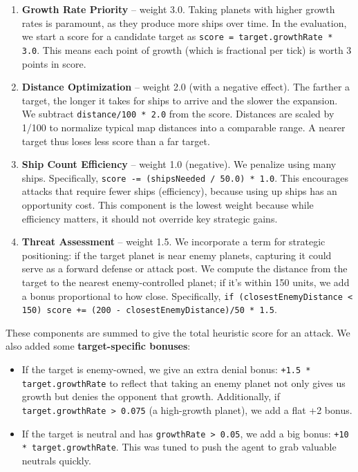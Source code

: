 \documentclass[conference]{IEEEtran}
\begin{document}
\begin{enumerate}
\item \textbf{Growth Rate Priority} -- weight 3.0. Taking planets with higher growth rates is paramount, as they produce more ships over time. In the evaluation, we start a score for a candidate target as \texttt{score = target.growthRate * 3.0}. This means each point of growth (which is fractional per tick) is worth 3 points in score.

\item \textbf{Distance Optimization} -- weight 2.0 (with a negative effect). The farther a target, the longer it takes for ships to arrive and the slower the expansion. We subtract \texttt{distance/100 * 2.0} from the score. Distances are scaled by 1/100 to normalize typical map distances into a comparable range. A nearer target thus loses less score than a far target.

\item \textbf{Ship Count Efficiency} -- weight 1.0 (negative). We penalize using many ships. Specifically, \texttt{score -= (shipsNeeded / 50.0) * 1.0}. This encourages attacks that require fewer ships (efficiency), because using up ships has an opportunity cost. This component is the lowest weight because while efficiency matters, it should not override key strategic gains.

\item \textbf{Threat Assessment} -- weight 1.5. We incorporate a term for strategic positioning: if the target planet is near enemy planets, capturing it could serve as a forward defense or attack post. We compute the distance from the target to the nearest enemy-controlled planet; if it's within 150 units, we add a bonus proportional to how close. Specifically, \texttt{if (closestEnemyDistance < 150) score += (200 - closestEnemyDistance)/50 * 1.5}.
\end{enumerate}

These components are summed to give the total heuristic score for an attack. We also added some \textbf{target-specific bonuses}:

\begin{itemize}
\item If the target is enemy-owned, we give an extra denial bonus: \texttt{+1.5 * target.growthRate} to reflect that taking an enemy planet not only gives us growth but denies the opponent that growth. Additionally, if \texttt{target.growthRate > 0.075} (a high-growth planet), we add a flat +2 bonus.

\item If the target is neutral and has \texttt{growthRate > 0.05}, we add a big bonus: \texttt{+10 * target.growthRate}. This was tuned to push the agent to grab valuable neutrals quickly.
\end{itemize}
\end{document}

